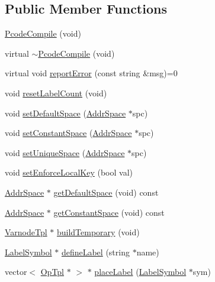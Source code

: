 \subsection*{Public Member Functions}
\begin{DoxyCompactItemize}
\item 
\mbox{\hyperlink{class_pcode_compile_ace772524dfca64b26fec82e7edd752b0}{Pcode\+Compile}} (void)
\item 
virtual \mbox{\hyperlink{class_pcode_compile_a26e89dcca4144f9bd91fcdd7af756177}{$\sim$\+Pcode\+Compile}} (void)
\item 
virtual void \mbox{\hyperlink{class_pcode_compile_af18d2709e08b84b7cb21fbf1411a9f82}{report\+Error}} (const string \&msg)=0
\item 
void \mbox{\hyperlink{class_pcode_compile_ae395a68b9a0223d0ecbcc02c33c209b6}{reset\+Label\+Count}} (void)
\item 
void \mbox{\hyperlink{class_pcode_compile_af7985f4e76ed0efc5c9aa9dbe6d0a218}{set\+Default\+Space}} (\mbox{\hyperlink{class_addr_space}{Addr\+Space}} $\ast$spc)
\item 
void \mbox{\hyperlink{class_pcode_compile_af7e8818253a38675b526406dde5a4e6e}{set\+Constant\+Space}} (\mbox{\hyperlink{class_addr_space}{Addr\+Space}} $\ast$spc)
\item 
void \mbox{\hyperlink{class_pcode_compile_a18b718ada4ad4122a2fe7da86490df92}{set\+Unique\+Space}} (\mbox{\hyperlink{class_addr_space}{Addr\+Space}} $\ast$spc)
\item 
void \mbox{\hyperlink{class_pcode_compile_adfc1e533f15be38cb5169f00bc4d0f2f}{set\+Enforce\+Local\+Key}} (bool val)
\item 
\mbox{\hyperlink{class_addr_space}{Addr\+Space}} $\ast$ \mbox{\hyperlink{class_pcode_compile_ac881af99317cc5deeea0a581c3915248}{get\+Default\+Space}} (void) const
\item 
\mbox{\hyperlink{class_addr_space}{Addr\+Space}} $\ast$ \mbox{\hyperlink{class_pcode_compile_a94818a38c3750f1e25e83936a734b953}{get\+Constant\+Space}} (void) const
\item 
\mbox{\hyperlink{class_varnode_tpl}{Varnode\+Tpl}} $\ast$ \mbox{\hyperlink{class_pcode_compile_a376e7dc6da993a0a5ebc0ea372add1af}{build\+Temporary}} (void)
\item 
\mbox{\hyperlink{class_label_symbol}{Label\+Symbol}} $\ast$ \mbox{\hyperlink{class_pcode_compile_a2398d38e48c70e73eab926baf160f2d0}{define\+Label}} (string $\ast$name)
\item 
vector$<$ \mbox{\hyperlink{class_op_tpl}{Op\+Tpl}} $\ast$ $>$ $\ast$ \mbox{\hyperlink{class_pcode_compile_a838d3e556360e1fd8f365453165a0cda}{place\+Label}} (\mbox{\hyperlink{class_label_symbol}{Label\+Symbol}} $\ast$sym)

\end{DoxyCompactItemize}
